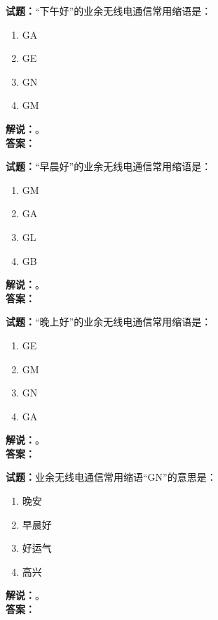 \documentclass{ctexbook}
\begin{document}
\vspace{\baselineskip}

\noindent\textbf{试题：}“下午好”的业余无线电通信常用缩语是：
\begin{enumerate}[leftmargin=3em]
  \item GA
  \item GE
  \item GN
  \item GM
\end{enumerate}
\noindent\textbf{解说：}\textbf{}。\\\noindent\textbf{答案：}

\vspace{\baselineskip}

\noindent\textbf{试题：}“早晨好”的业余无线电通信常用缩语是：
\begin{enumerate}[leftmargin=3em]
  \item GM
  \item GA
  \item GL
  \item GB
\end{enumerate}
\noindent\textbf{解说：}\textbf{}。\\\noindent\textbf{答案：}

\vspace{\baselineskip}

\noindent\textbf{试题：}“晚上好”的业余无线电通信常用缩语是：
\begin{enumerate}[leftmargin=3em]
  \item GE
  \item GM
  \item GN
  \item GA
\end{enumerate}
\noindent\textbf{解说：}\textbf{}。\\\noindent\textbf{答案：}

\vspace{\baselineskip}

\noindent\textbf{试题：}业余无线电通信常用缩语“GN”的意思是：
\begin{enumerate}[leftmargin=3em]
  \item 晚安
  \item 早晨好
  \item 好运气
  \item 高兴
\end{enumerate}
\noindent\textbf{解说：}\textbf{}。\\\noindent\textbf{答案：}

\vspace{\baselineskip}
\end{document}

